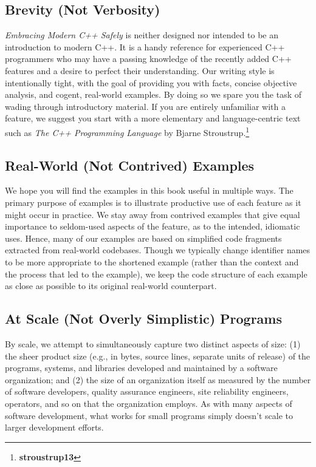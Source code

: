 \subsection{Brevity (Not Verbosity)}

\textit{Embracing Modern C++ Safely} is neither designed nor intended to be an introduction to modern C++. It is a handy reference for experienced C++ programmers who may have a passing knowledge of the recently added C++ features and a desire to perfect their understanding. Our writing style is intentionally tight, with the goal of providing you with facts, concise objective analysis, and cogent, real-world examples. By doing so we spare you the task of wading through introductory material. If you are entirely unfamiliar with a feature, we suggest you start with a more elementary and language-centric text such as \textit{The C++ Programming Language} by Bjarne Stroustrup.\footnote{\textbf{stroustrup13}}

\subsection{Real-World (Not Contrived) Examples}

We hope you will find the examples in this book useful in multiple ways. The primary purpose of examples is to illustrate productive use of each feature as it might occur in practice. We stay away from contrived examples that give equal importance to seldom-used aspects of the feature, as to the intended, idiomatic uses. Hence, many of our examples are based on simplified code fragments extracted from real-world codebases. Though we typically change identifier names to be more appropriate to the shortened example (rather than the context and the process that led to the example), we keep the code structure of each example as close as possible to its original real-world counterpart.

\subsection{At Scale (Not Overly Simplistic) Programs}

By scale, we attempt to simultaneously capture two distinct aspects of size: (1) the sheer product size (e.g., in bytes, source lines, separate units of release) of the programs, systems, and libraries developed and maintained by a software organization; and (2) the size of an organization itself as measured by the number of software developers, quality assurance engineers, site reliability engineers, operators, and so on that the organization employs. As with many aspects of software development, what works for small programs simply doesn’t scale to larger development efforts.

